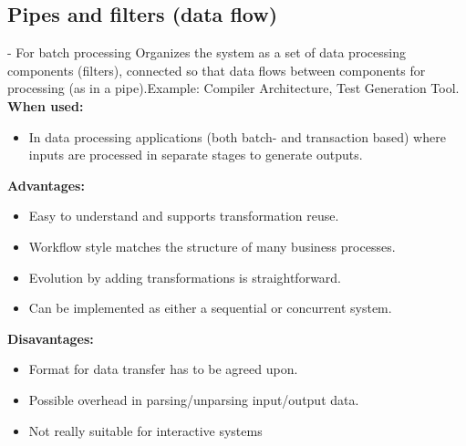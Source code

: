 \documentclass[../ESOF_notes.tex]{subfiles}
\begin{document}
    \subsection{Pipes and filters (data flow)} - For batch processing\newline\newline
        Organizes the system as a set of data processing components (filters), connected so that data flows between components for processing (as in a pipe).\newline Example: Compiler Architecture, Test Generation Tool.\newline\newline
        \textbf{When used:} 
        \begin{itemize}
            \item In data processing applications (both batch- and transaction based) where inputs are processed in separate stages to generate outputs.
        \end{itemize}
        \textbf{Advantages:} 
        \begin{itemize}
            \item Easy to understand and supports transformation reuse.
            \item Workflow style matches the structure of many business processes.
            \item Evolution by adding transformations is straightforward.
            \item Can be implemented as either a sequential or concurrent system.
        \end{itemize}
        \textbf{Disavantages:}
        \begin{itemize}
            \item Format for data transfer has to be agreed upon.
            \item Possible overhead in parsing/unparsing input/output data.
            \item Not really suitable for interactive systems
        \end{itemize}
        
\end{document}
